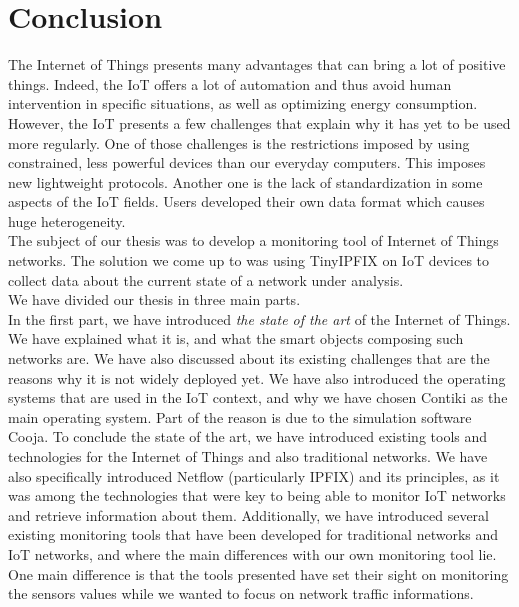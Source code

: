 \chapter*{Conclusion}

The Internet of Things presents many advantages that can bring a lot of positive things. Indeed, the IoT offers a lot of automation and thus avoid human intervention in specific situations, as well as optimizing energy consumption. However, the IoT presents a few challenges that explain why it has yet to be used more regularly. One of those challenges is the restrictions imposed by using constrained, less powerful devices than our everyday computers. This imposes new lightweight protocols. Another one is the lack of standardization in some aspects of the IoT fields. Users developed their own data format which causes huge heterogeneity.\\

The subject of our thesis was to develop a monitoring tool of Internet of Things networks. The solution we come up to was using TinyIPFIX on IoT devices to collect data about the current state of a network under analysis.\\

We have divided our thesis in three main parts.\\

In the first part, we have introduced \textit{the state of the art} of the Internet of Things. We have explained what it is, and what the smart objects composing such networks are. We have also discussed about its existing challenges that are the reasons why it is not widely deployed yet. We have also introduced the operating systems that are used in the IoT context, and why we have chosen Contiki as the main operating system. Part of the reason is due to the simulation software Cooja. To conclude the state of the art, we have introduced existing tools and technologies for the Internet of Things and also traditional networks. We have also specifically introduced Netflow (particularly IPFIX) and its principles, as it was among the technologies that were key to being able to monitor IoT networks and retrieve information about them. Additionally, we have introduced several existing monitoring tools that have been developed for traditional networks and IoT networks, and where the main differences with our own monitoring tool lie. One main difference is that the tools presented have set their sight on monitoring the sensors values while we wanted to focus on network traffic informations.\\

